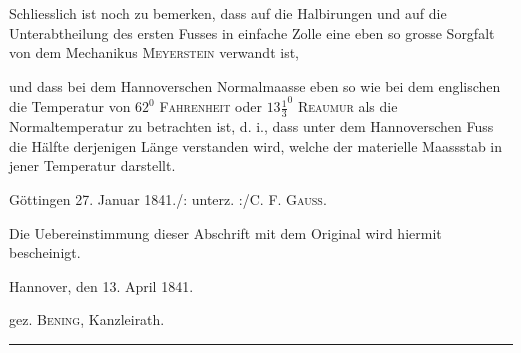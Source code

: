 Schliesslich ist noch zu bemerken, dass auf die Halbirungen und auf die
Unterabtheilung des ersten Fusses in einfache Zolle eine eben so grosse Sorgfalt
von dem Mechanikus \textsc{Meyerstein} verwandt ist,

und dass bei dem Hannoverschen Normalmaasse eben so wie bei dem
englischen die Temperatur von \(62^{0}\) \textsc{Fahrenheit} oder \(13\frac{1}{3}^{0}\) \textsc{Reaumur} als die
Normaltemperatur zu betrachten ist, d. i., dass unter dem Hannoverschen Fuss
die Hälfte derjenigen Länge verstanden wird, welche der materielle Maassstab
in jener Temperatur darstellt.

\medskip\noindent\hspace*{\parindent}Göttingen 27. Januar 1841.\hfill /: unterz. :/\quad C. F. \textsc{Gauss}.

\bigskip\noindent\hfill\begin{minipage}{.66\linewidth}
\small\setlength{\parindent}{1.2em}
\indent Die Uebereinstimmung dieser Abschrift mit dem Original
wird hiermit bescheinigt.

Hannover, den 13. April 1841.

\begin{center}gez. \textsc{Bening}, Kanzleirath.\end{center}
\end{minipage}
\vspace{2em}
\begin{center}\rule{1.25in}{.3pt}\end{center}
\clearpage\endgroup
